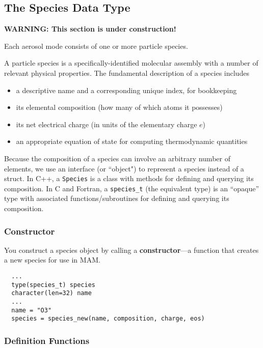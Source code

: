 \subsection{The Species Data Type}

{\bf WARNING: This section is under construction!}

Each aerosol mode consists of one or more particle species.

A particle species is a specifically-identified molecular assembly with
a number of relevant physical properties. The fundamental description of a
species includes

\begin{itemize}
  \item a descriptive name and a corresponding unique index, for bookkeeping
  \item its elemental composition (how many of which atoms it possesses)
  \item its net electrical charge (in units of the elementary charge $e$)
  \item an appropriate equation of state for computing thermodynamic quantities
\end{itemize}

Because the composition of a species can involve an arbitrary number of
elements, we use an interface (or ``object") to represent a species instead of
a struct. In C++, a \verb|Species| is a class with methods for defining and
querying its composition. In C and Fortran, a \verb|species_t| (the equivalent
type) is an ``opaque'' type with associated functions/subroutines for defining
and querying its composition.

\subsubsection*{Constructor}

You construct a species object by calling a {\bf constructor}---a
function that creates a new species for use in MAM.

\begin{verbatim}
  ...
  type(species_t) species
  character(len=32) name
  ...
  name = "O3"
  species = species_new(name, composition, charge, eos)

\end{verbatim}

\subsubsection*{Definition Functions}

